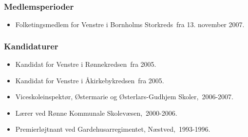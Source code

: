 \documentclass[11pt, a4paper]{awesome-cv}
\begin{document}
\begin{cvletter}
\subsubsection*{Medlemsperioder}
\begin{itemize}
\item Folketingsmedlem for Venstre i Bornholms Storkreds fra 13. november 2007.
\end{itemize}
\subsubsection*{Kandidaturer}
\begin{itemize}
\item Kandidat for Venstre i Rønnekredsen fra 2005.
\item Kandidat for Venstre i Åkirkebykredsen fra 2005.
\end{itemize}
\begin{itemize}
\item Viceskoleinspektør, Østermarie og Østerlars-Gudhjem Skoler, 2006-2007.
\item Lærer ved Rønne Kommunale Skolevæsen, 2000-2006.
\item Premierløjtnant ved Gardehusarregimentet, Næstved, 1993-1996.
\end{itemize}
\end{cvletter}
\end{document}
